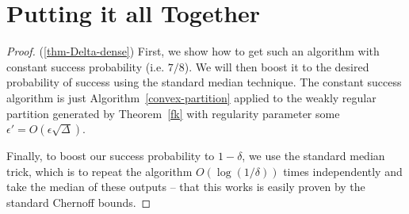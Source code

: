 \documentclass[final, 12pt]{colt2018}
\theoremstyle{definition}
\theoremstyle{plain}
\begin{document}
\section{Putting it all Together}

\begin{proof}(\cref{thm-Delta-dense})
First, we show how to get such an algorithm with constant success probability (i.e. $7/8$). We will then boost it to the desired probability of success using the standard median technique. 
The constant success algorithm is just 
Algorithm~\ref{convex-partition} applied to the weakly regular partition generated by Theorem~\ref{fk} with regularity parameter some $\epsilon' = O(\epsilon \sqrt{\Delta})$.

Finally, to boost our success probability to $1 - \delta$, we use the standard median trick, which is to repeat the algorithm $O(\log(1/\delta))$ times independently and take the median of these outputs -- that this works is easily proven by the standard Chernoff bounds.
\end{proof}
\fi
\end{document}
